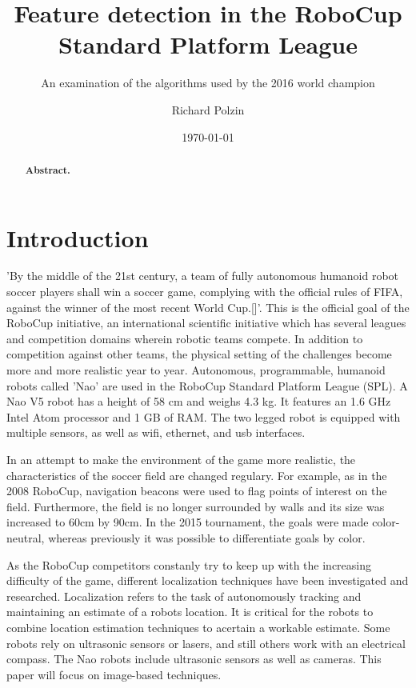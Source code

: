 \documentclass[12pt, a4paper]{scrartcl}
\author{Richard Polzin}
\title{Feature detection in the RoboCup Standard Platform League}
\subtitle{An examination of the algorithms used by the 2016 world champion}
\date{\today}
\begin{document}
  \maketitle

  \begin{abstract}
    \textbf{Abstract.}
  \end{abstract}

  \section{Introduction}
  'By the middle of the 21st century, a team of fully autonomous humanoid robot soccer players shall win a soccer game, complying with the official rules of FIFA, against the winner of the most recent World Cup.[]'. This is the official goal of the RoboCup initiative, an international scientific initiative which has several leagues and competition domains wherein robotic teams compete. In addition to competition against other teams, the physical setting of the challenges become more and more realistic year to year. Autonomous, programmable, humanoid robots called 'Nao' are used in the RoboCup Standard Platform League (SPL). A Nao V5 robot has a height of 58 cm and weighs 4.3 kg. It features an 1.6 GHz Intel Atom processor and 1 GB of RAM. The two legged robot is equipped with multiple sensors, as well as wifi, ethernet, and usb interfaces.

  In an attempt to make the environment of the game more realistic, the characteristics of the soccer field are changed regulary. For example, as in the 2008 RoboCup, navigation beacons were used to flag points of interest on the field. Furthermore, the field is no longer surrounded by walls and its size was increased to 60cm by 90cm. In the 2015 tournament, the goals were made color-neutral, whereas previously it was possible to differentiate goals by color.

  As the RoboCup competitors constanly try to keep up with the increasing difficulty of the game, different localization techniques have been investigated and researched. Localization refers to the task of autonomously tracking and maintaining an estimate of a robots location. It is critical for the robots to combine location estimation techniques to acertain a workable estimate. Some robots rely on ultrasonic sensors or lasers, and still others work with an electrical compass. The Nao robots include ultrasonic sensors as well as cameras. This paper will focus on image-based techniques.
\end{document}
